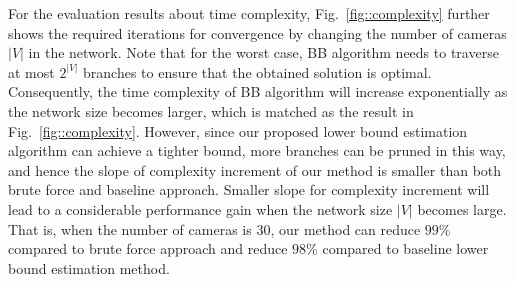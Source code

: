 
For the evaluation results about time complexity, Fig.~\ref{fig::complexity} further shows the required iterations for convergence by changing the number of cameras $|V|$ in the network.
Note that for the worst case, BB algorithm needs to traverse at most $2^{|V|}$ branches to ensure that the obtained solution is optimal.
Consequently, the time complexity of BB algorithm will increase exponentially as the network size becomes larger, which is matched as the result in Fig.~\ref{fig::complexity}.
However, since our proposed lower bound estimation algorithm can achieve a tighter bound, more branches can be pruned in this way, and hence the slope of complexity increment of our method is smaller than both brute force and baseline approach.
Smaller slope for complexity increment will lead to a considerable performance gain when the network size $|V|$ becomes large.
That is, when the number of cameras is $30$, our method can reduce $99\%$ compared to brute force approach and reduce $98\%$ compared to baseline lower bound estimation method.
%
